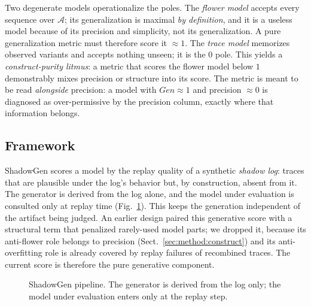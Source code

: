 \documentclass[runningheads]{llncs}
\newcommand{\genshadow}{\ensuremath{\mathit{Gen}_{\mathit{shadow}}}}
\newcommand{\genaccept}{\ensuremath{\mathit{Gen}_{\mathit{accept}}}}
\newcommand{\punseen}{\ensuremath{p_{\mathit{unseen}}}}
\newcommand{\pend}{\ensuremath{p_{\mathit{end}}}}
\begin{document}
Two degenerate models operationalize the poles. The \emph{flower model} accepts every sequence over $\mathcal{A}$; its generalization is maximal \emph{by definition}, and it is a useless model because of its precision and simplicity, not its generalization. A pure generalization metric must therefore score it $\approx 1$. The \emph{trace model} memorizes observed variants and accepts nothing unseen; it is the $0$ pole. This yields a \emph{construct-purity litmus}: a metric that scores the flower model below $1$ demonstrably mixes precision or structure into its score. The metric is meant to be read \emph{alongside} precision: a model with $\mathit{Gen}\approx 1$ and precision $\approx 0$ is diagnosed as over-permissive by the precision column, exactly where that information belongs.

\subsection{Framework}
\label{sec:method:framework}
ShadowGen scores a model by the replay quality of a synthetic \emph{shadow log}: traces that are plausible under the log's behavior but, by construction, absent from it. The generator is derived from the log alone, and the model under evaluation is consulted only at replay time (Fig.~\ref{fig:pipeline}). This keeps the generation independent of the artifact being judged. An earlier design paired this generative score with a structural term that penalized rarely-used model parts; we dropped it, because its anti-flower role belongs to precision (Sect.~\ref{sec:method:construct}) and its anti-overfitting role is already covered by replay failures of recombined traces. The current score is therefore the pure generative component.

\begin{figure}[t]
\centering
{}
\caption{ShadowGen pipeline. The generator is derived from the log only; the model under evaluation enters only at the replay step.}
\label{fig:pipeline}
\end{figure}
\end{document}
